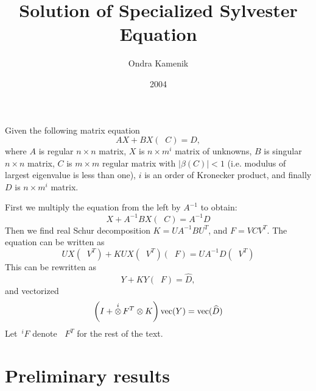 \documentclass[11pt,a4paper]{article}
\begin{document}
\title{Solution of Specialized Sylvester Equation}
\author{Ondra Kamenik}
\date{2004}
\maketitle

\renewcommand{\vec}{\mathop{\hbox{vec}}}
\newcommand{\otimesi}{\mathop{\overset{i}{\otimes}}}
\newcommand{\iF}{\,^i\!F}
\newcommand{\imF}{\,^{i-1}\!F}
\newcommand{\solvi}{\mathbf{solv1}}
\newcommand{\solvii}{\mathbf{solv2}}
\newcommand{\solviip}{\mathbf{solv2p}}

\newtheorem{lemma}{Lemma}

Given the following matrix equation
$$AX+BX\left(\otimesi C\right)=D,$$ where $A$ is regular $n\times n$
matrix, $X$ is $n\times m^i$ matrix of unknowns, $B$ is singular
$n\times n$ matrix, $C$ is $m\times m$ regular matrix with
$|\beta(C)|<1$ (i.e. modulus of largest eigenvalue is less than one),
$i$ is an order of Kronecker product, and finally $D$ is $n\times m^i$
matrix.

First we multiply the equation from the left by $A^{-1}$ to obtain:
$$X+A^{-1}BX\left(\otimesi C\right)=A^{-1}D$$
Then we find real Schur decomposition $K=UA^{-1}BU^T$, and
$F=VCV^T$. The equation can be written as
$$UX\left(\otimesi V^T\right) +
KUX\left(\otimesi V^T\right)\left(\otimesi F\right) =
UA^{-1}D\left(\otimesi V^T\right)$$
This can be rewritten as
$$Y + KY\left(\otimesi F\right)=\widehat{D},$$
and vectorized
$$\left(I+\otimesi F^T\otimes K\right)\vec(Y)=\vec(\widehat{D})$$
Let $\iF$ denote $\otimesi F^T$ for the rest of the text.

\section{Preliminary results}
\end{document}
